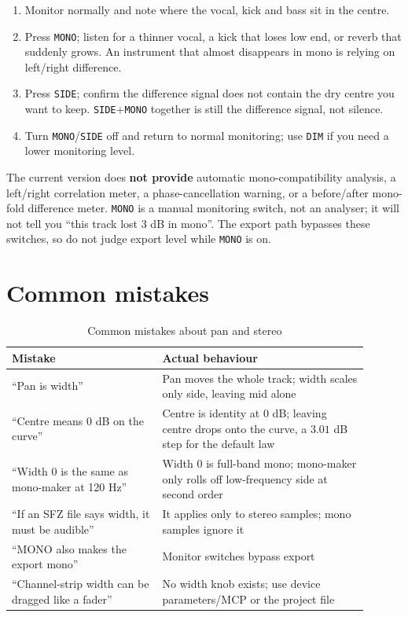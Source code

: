 \begin{enumerate}
  \item Monitor normally and note where the vocal, kick and bass sit in the centre.
  \item Press \texttt{MONO}; listen for a thinner vocal, a kick that loses low end, or reverb that suddenly grows. An instrument that almost disappears in mono is relying on left/right difference.
  \item Press \texttt{SIDE}; confirm the difference signal does not contain the dry centre you want to keep. \texttt{SIDE}+\texttt{MONO} together is still the difference signal, not silence.
  \item Turn \texttt{MONO}/\texttt{SIDE} off and return to normal monitoring; use \texttt{DIM} if you need a lower monitoring level.
\end{enumerate}

The current version does \textbf{not provide} automatic mono-compatibility analysis, a left/right correlation meter, a phase-cancellation warning, or a before/after mono-fold difference meter. \texttt{MONO} is a manual monitoring switch, not an analyser; it will not tell you ``this track lost 3 dB in mono''. The export path bypasses these switches, so do not judge export level while \texttt{MONO} is on.

\section{Common mistakes}

\begin{table}[htbp]
\centering
\small
\begin{tabular}{@{}p{0.38\linewidth}p{0.52\linewidth}@{}}
\hline
Mistake & Actual behaviour \\
\hline
``Pan is width'' & Pan moves the whole track; width scales only side, leaving mid alone \\
``Centre means 0 dB on the curve'' & Centre is identity at 0 dB; leaving centre drops onto the curve, a $3.01$ dB step for the default law \\
``Width 0 is the same as mono-maker at 120 Hz'' & Width 0 is full-band mono; mono-maker only rolls off low-frequency side at second order \\
``If an SFZ file says width, it must be audible'' & It applies only to stereo samples; mono samples ignore it \\
``MONO also makes the export mono'' & Monitor switches bypass export \\
``Channel-strip width can be dragged like a fader'' & No width knob exists; use device parameters/MCP or the project file \\
\hline
\end{tabular}
\caption{Common mistakes about pan and stereo}
\label{tab:stereo-mistakes}
\end{table}

